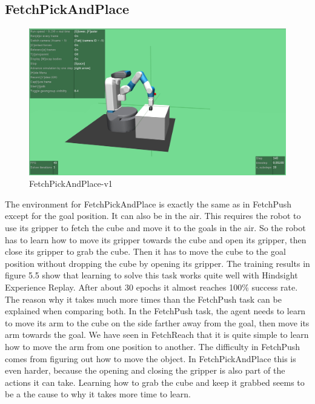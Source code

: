 \subsection{FetchPickAndPlace}

\begin{figure} [h]
	
	\centering
	\includegraphics[width=1\textwidth]{figures/FetchPickAndPlace-v1.png}
	\caption{FetchPickAndPlace-v1}
	
\end{figure}

The environment for FetchPickAndPlace is exactly the same as in FetchPush except for the goal position. It can also be in the air. This requires the robot to use its gripper to fetch the cube and move it to the goals in the air. So the robot has to learn how to move its gripper towards the cube and open its gripper, then close its gripper to grab the cube. Then it has to move the cube to the goal position without dropping the cube by opening its gripper. 
The training results in figure 5.5 show that learning to solve this task works quite well with Hindsight Experience Replay. After about 30 epochs it almost reaches 100\% success rate. 
The reason why it takes much more times than the FetchPush task can be explained when comparing both. In the FetchPush task, the agent needs to learn to move its arm to the cube on the side farther away from the goal, then move its arm towards the goal. We have seen in FetchReach that it is quite simple to learn how to move the arm from one position to another. The difficulty in FetchPush comes from figuring out how to move the object. In FetchPickAndPlace this is even harder, because the opening and closing the gripper is also part of the actions it can take. Learning how to grab the cube and keep it grabbed seems to be a the cause to why it takes more time to learn. 

